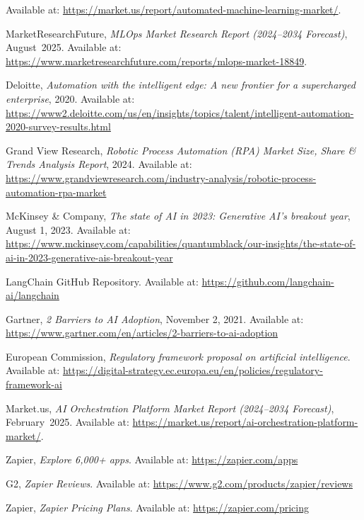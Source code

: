     Available at: \url{https://market.us/report/automated-machine-learning-market/}.

    MarketResearchFuture, \textit{MLOps Market Research Report (2024--2034 Forecast)}, August~2025.  
    Available at: \url{https://www.marketresearchfuture.com/reports/mlops-market-18849}.

    Deloitte, \textit{Automation with the intelligent edge: A new frontier for a supercharged enterprise}, 2020. Available at: \url{https://www2.deloitte.com/us/en/insights/topics/talent/intelligent-automation-2020-survey-results.html}

    Grand View Research, \textit{Robotic Process Automation (RPA) Market Size, Share \& Trends Analysis Report}, 2024. Available at: \url{https://www.grandviewresearch.com/industry-analysis/robotic-process-automation-rpa-market}

    McKinsey \& Company, \textit{The state of AI in 2023: Generative AI’s breakout year}, August 1, 2023. Available at: \url{https://www.mckinsey.com/capabilities/quantumblack/our-insights/the-state-of-ai-in-2023-generative-ais-breakout-year}


    LangChain GitHub Repository. Available at: \url{https://github.com/langchain-ai/langchain}

    Gartner, \textit{2 Barriers to AI Adoption}, November 2, 2021. Available at: \url{https://www.gartner.com/en/articles/2-barriers-to-ai-adoption}

    European Commission, \textit{Regulatory framework proposal on artificial intelligence}. Available at: \url{https://digital-strategy.ec.europa.eu/en/policies/regulatory-framework-ai}
    
    Market.us, \textit{AI Orchestration Platform Market Report (2024--2034 Forecast)}, February~2025. Available at: \url{https://market.us/report/ai-orchestration-platform-market/}.

    Zapier, \textit{Explore 6,000+ apps}. Available at: \url{https://zapier.com/apps}

    G2, \textit{Zapier Reviews}. Available at: \url{https://www.g2.com/products/zapier/reviews}

    Zapier, \textit{Zapier Pricing Plans}. Available at: \url{https://zapier.com/pricing}


